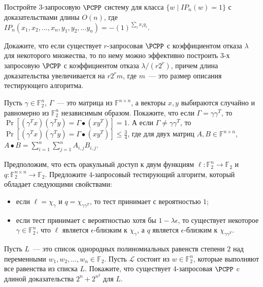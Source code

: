 \begin{task}
	Постройте $3$-запросовую $\PCPP$ систему для класса $\{w \mid IP_n(w) = 1\}$ с доказательствами длины $O(n)$, где $IP_n(x_1, x_2,
    \dots, x_n, y_1, y_2,\dots y_n) = -(1)^{\sum\limits_i x_i y_i}$.
\end{task}


\begin{task}
    Докажите, что если существует $r$-запросовая $\PCPP$ с коэффициентом отказа $\lambda$ для некоторого множества, то по нему
    можно эффективно построить $3$-х запросовую $\PCPP$ с коэффициентом отказа $\lambda / (r 2^r)$, причем длина доказательства
    увеличивается на $r 2^rm$, где $m$~--- это размер описания тестирующего алгоритма.
\end{task}

\begin{task}
    Пусть $\gamma \in \mathbb{F}_2^n$, $\Gamma$~--- это матрица из $\mathbb{F}^{n \times n}$, а векторы $x, y$ выбираются случайно
    и равномерно из $\mathbb{F}_2^n$ независимым образом. Покажите, что если $\Gamma = \gamma \gamma^T$, то
    $\Pr[(\gamma^T x) (\gamma^T y) = \Gamma \bullet (x y^T)] = 1$. А если $\Gamma \neq \gamma \gamma^T$, то
    $\Pr[(\gamma^T x) (\gamma^T y) = \Gamma \bullet (x y^T)] \le \frac{3}{4}$, где для двух матриц $A, B \in
    \mathbb{F}^{n \times n}$, $A \bullet B = \sum\limits_{i = 1}^n \sum\limits_{j = 1}^n A_{i, j} B_{i, j}$.
\end{task}


\begin{task}
	Предположим, что есть оракульный доступ к двум функциям $\ell: \mathbb{F}_2^n \to \mathbb{F}_2$ и
    $q: \mathbb{F}_2^{n \times n} \to \mathbb{F}_2$. Предложите $4$-запросовый тестирующий алгоритм, который обладает следующими
    свойствами:
    \begin{itemize}
        \item если $\ell = \chi_{\gamma}$ и $q = \chi_{\gamma \gamma^T}$, то тест принимает с вероятностью $1$;
        \item если тест принимает с вероятностью хотя бы $1 - \lambda \epsilon$, то существует некоторое $\gamma \in
			\mathbb{F}_2^n$, что $\ell$ является $\epsilon$-близким к $\chi_\gamma$, а $q$ является $\epsilon$-близким к
            $\chi_{\gamma \gamma^T}$.
    \end{itemize}
\end{task}


\begin{task}
    Пусть $L$~--- это список однородных полиномиальных равенств степени $2$ над переменными $w_1, w_2, \dots, w_n \in
    \mathbb{F}_2$. Пусть $\mathcal{L}$ состоит из $w \in \mathbb{F}_2^n$, которые выполняют все равенства из списка $L$. Покажите,
    что существует $4$-запросовая $\PCPP$ c длиной доказательства $2^n + 2^{n^2}$ для $L$.
\end{task}


